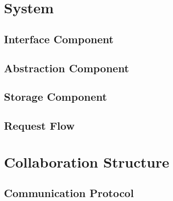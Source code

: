 \section{System}

\subsection{Interface Component}

\subsection{Abstraction Component}

\subsection{Storage Component}

\subsection{Request Flow}

\section{Collaboration Structure}

\subsection{Communication Protocol}